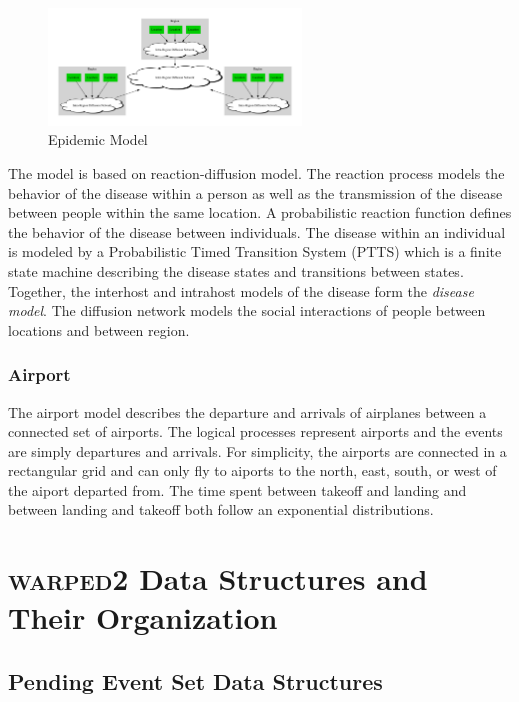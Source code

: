\documentclass[11pt]{book}
\begin{document}
\begin{figure}[H]
    \centering
    \includegraphics[width=0.6\textwidth]{figs/graphviz/epidemic.pdf}
    \caption{Epidemic Model}\label{epidemic_model}
\end{figure}

The model is based on reaction-diffusion model\cite{perumalla-12}. The reaction process
models the behavior of the disease within a person as well as the transmission of the
disease between people within the same location. A probabilistic reaction function defines
the behavior of the disease between individuals\cite{barrett-08}. The disease within an
individual is modeled by a Probabilistic Timed Transition System (PTTS)\cite{barrett-08}
which is a finite state machine describing the disease states and transitions between states.
Together, the interhost and intrahost models of the disease form the \emph{disease model}.
The diffusion network models the social interactions of people between locations and between
region\cite{barrett-08}.

\subsection{Airport}

The airport model describes the departure and arrivals of airplanes between a connected
set of airports. The logical processes represent airports and the events are simply
departures and arrivals. For simplicity, the airports are connected in a rectangular grid
and can only fly to aiports to the north, east, south, or west of the aiport departed from.
The time spent between takeoff and landing and between landing and takeoff both follow an
exponential distributions.

\chapter{\textsc{warped2} Data Structures and Their Organization}\label{warped2_ds}

\section{Pending Event Set Data Structures}
\end{document}
